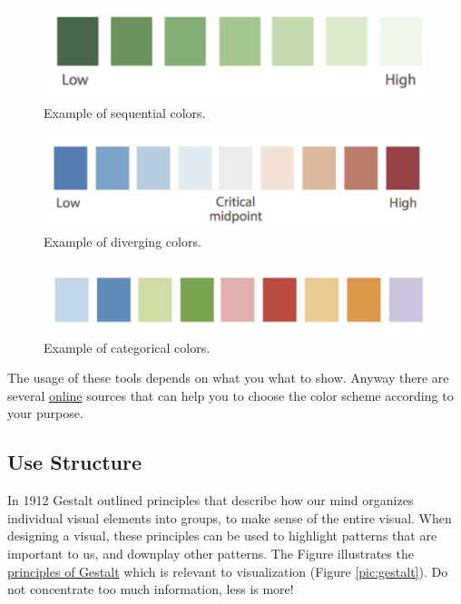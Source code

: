 \begin{figure}[H]%
 \centering
 \includegraphics[width=13cm]{./img/06/sequential}
 \caption{\label{pic:sequential} Example of sequential colors.}
\end{figure}


\begin{figure}[H]%
 \centering
 \includegraphics[width=13cm]{./img/06/diverging}
 \caption{\label{pic:diverging} Example of diverging colors.}
\end{figure}

\begin{figure}[H]%
 \centering
 \includegraphics[width=13cm]{./img/06/categorical}
 \caption{\label{pic:categorical} Example of categorical colors.}
\end{figure}

The usage of these tools depends on what you what to show. Anyway there are several \href{http://colorbrewer2.org/#type=sequential\&scheme=BuGn\&n=3}{online} sources that can help you to choose the color scheme according to your purpose.

\subsection*{Use Structure}

In 1912 Gestalt outlined principles that describe how our mind organizes individual visual elements into groups, to make sense of the entire visual. When designing a visual, these principles can be used to highlight patterns that are important to us, and downplay other patterns. The Figure  illustrates the \href{http://www.fusioncharts.com/blog/2014/03/how-to-use-the-gestalt-principles-for-visual-storytelling-podv/}{principles of Gestalt} which is relevant to visualization (Figure \ref{pic:gestalt}). Do not concentrate too much information, less is more!

